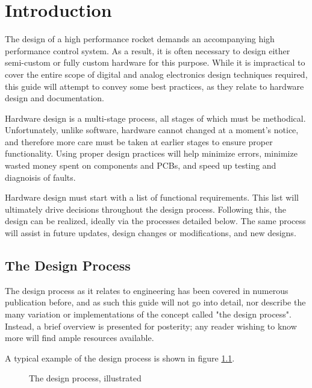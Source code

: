 \documentclass[12pt,article]{memoir}
\begin{document}
\chapter{Introduction}
The design of a high performance rocket demands an accompanying high performance control system. As a result, it is often necessary to design either semi-custom or fully custom hardware for this purpose. While it is impractical to cover the entire scope of digital and analog electronics design techniques required, this guide will attempt to convey some best practices, as they relate to hardware design and documentation.\par
Hardware design is a multi-stage process, all stages of which must be methodical. Unfortunately, unlike software, hardware cannot changed at a moment's notice, and therefore more care must be taken at earlier stages to ensure proper functionality. Using proper design practices will help minimize errors, minimize wasted money spent on components and PCBs, and speed up testing and diagnoisis of faults.\par
Hardware design must start with a list of functional requirements. This list will ultimately drive decisions throughout the design process. Following this, the design can be realized, ideally via the processes detailed below. The same process will assist in future updates, design changes or modifications, and new designs.\par
\section{The Design Process}
The design process as it relates to engineering has been covered in numerous publication before, and as such this guide will not go into detail, nor describe the many variation or implementations of the concept called "the design process". Instead, a brief overview is presented for posterity; any reader wishing to know more will find ample resources available.\par
A typical example of the design process is shown in figure \ref{fig:design}.

\begin{figure}[H]
	\centering
	\caption{The design process, illustrated}
	\label{fig:design}
\end{figure}
\end{document}
